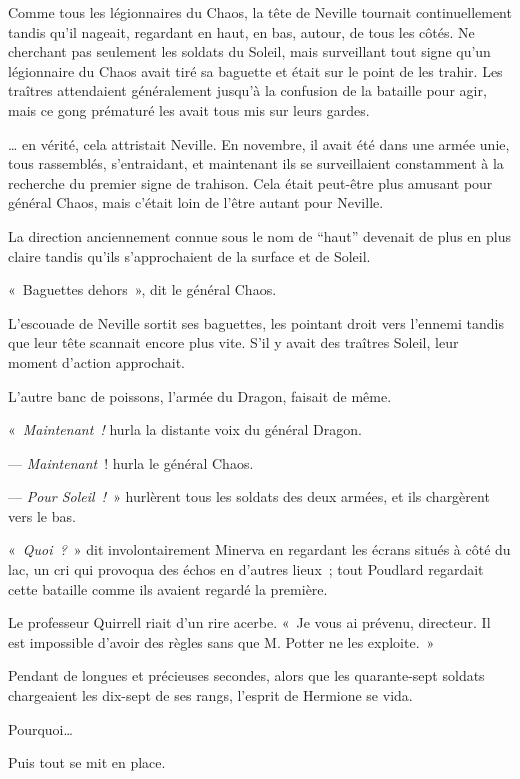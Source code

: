 Comme tous les légionnaires du Chaos, la tête de Neville tournait continuellement tandis qu'il nageait, regardant en haut, en bas, autour, de tous les côtés.
Ne cherchant pas seulement les soldats du Soleil, mais surveillant tout signe qu'un légionnaire du Chaos avait tiré sa baguette et était sur le point de les trahir.
Les traîtres attendaient généralement jusqu'à la confusion de la bataille pour agir, mais ce gong prématuré les avait tous mis sur leurs gardes.

… en vérité, cela attristait Neville.
En novembre, il avait été dans une armée unie, tous rassemblés, s'entraidant, et maintenant ils se surveillaient constamment à la recherche du premier signe de trahison.
Cela était peut-être plus amusant pour général Chaos, mais c'était loin de l'être autant pour Neville.

La direction anciennement connue sous le nom de “haut” devenait de plus en plus claire tandis qu'ils s'approchaient de la surface et de Soleil.

«~Baguettes dehors~», dit le général Chaos.

L'escouade de Neville sortit ses baguettes, les pointant droit vers l'ennemi tandis que leur tête scannait encore plus vite.
S'il y avait des traîtres Soleil, leur moment d'action approchait.

L'autre banc de poissons, l'armée du Dragon, faisait de même.

«~\emph{Maintenant~!} hurla la distante voix du général Dragon.

--- \emph{Maintenant}~! hurla le général Chaos.

--- \emph{Pour Soleil~!}~» hurlèrent tous les soldats des deux armées, et ils chargèrent vers le bas.

\later

«~\emph{Quoi~?}~» dit involontairement Minerva en regardant les écrans situés à côté du lac, un cri qui provoqua des échos en d'autres lieux~; tout Poudlard regardait cette bataille comme ils avaient regardé la première.

Le professeur Quirrell riait d'un rire acerbe.
«~Je vous ai prévenu, directeur.
Il est impossible d'avoir des règles sans que M. Potter ne les exploite.~»

\later

Pendant de longues et précieuses secondes, alors que les quarante-sept soldats chargeaient les dix-sept de ses rangs, l'esprit de Hermione se vida.

Pourquoi…

Puis tout se mit en place.

